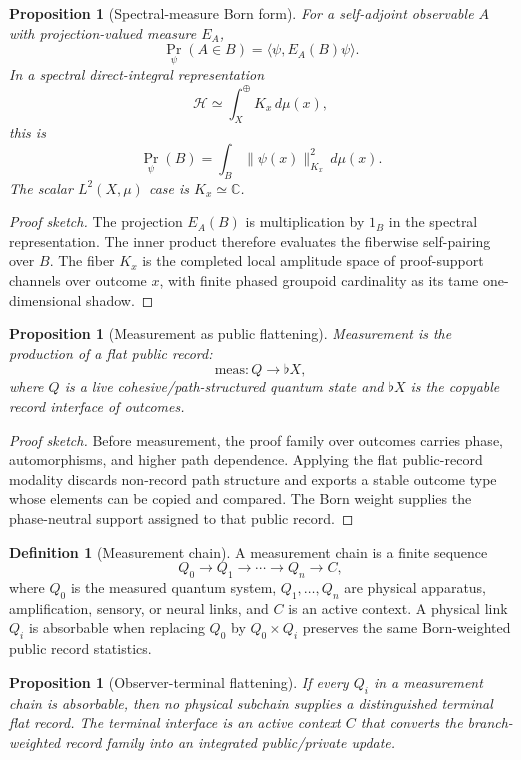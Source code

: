 \documentclass[11pt]{article}
\theoremstyle{plain}
\newtheorem{proposition}[theorem]{Proposition}
\theoremstyle{definition}
\newtheorem{definition}[theorem]{Definition}
\theoremstyle{remark}
\newenvironment{proofsketch}{\begin{proof}[Proof sketch]}{\end{proof}}
\newcommand{\Flat}{\flat}
\newcommand{\C}{\mathbb{C}}
\begin{document}
\begin{proposition}[Spectral-measure Born form]
For a self-adjoint observable \(A\) with projection-valued measure \(E_A\),
\[
\Pr_\psi(A\in B)=\langle\psi,E_A(B)\psi\rangle.
\]
In a spectral direct-integral representation
\[
\mathcal{H}\simeq\int_X^\oplus K_x\,d\mu(x),
\]
this is
\[
\Pr_\psi(B)=\int_B\|\psi(x)\|_{K_x}^2\,d\mu(x).
\]
The scalar \(L^2(X,\mu)\) case is \(K_x\simeq\C\).
\end{proposition}

\begin{proofsketch}
The projection \(E_A(B)\) is multiplication by \(1_B\) in the spectral representation. The inner product therefore evaluates the fiberwise self-pairing over \(B\). The fiber \(K_x\) is the completed local amplitude space of proof-support channels over outcome \(x\), with finite phased groupoid cardinality as its tame one-dimensional shadow.
\end{proofsketch}

\begin{proposition}[Measurement as public flattening]
Measurement is the production of a flat public record:
\[
\mathrm{meas}:Q\to\Flat X,
\]
where \(Q\) is a live cohesive/path-structured quantum state and \(\Flat X\) is the copyable record interface of outcomes.
\end{proposition}

\begin{proofsketch}
Before measurement, the proof family over outcomes carries phase, automorphisms, and higher path dependence. Applying the flat public-record modality discards non-record path structure and exports a stable outcome type whose elements can be copied and compared. The Born weight supplies the phase-neutral support assigned to that public record.
\end{proofsketch}

\begin{definition}[Measurement chain]
A measurement chain is a finite sequence
\[
Q_0\to Q_1\to\cdots\to Q_n\to C,
\]
where \(Q_0\) is the measured quantum system, \(Q_1,\ldots,Q_n\) are physical apparatus, amplification, sensory, or neural links, and \(C\) is an active context. A physical link \(Q_i\) is absorbable when replacing \(Q_0\) by \(Q_0\times Q_i\) preserves the same Born-weighted public record statistics.
\end{definition}

\begin{proposition}[Observer-terminal flattening]
If every \(Q_i\) in a measurement chain is absorbable, then no physical subchain supplies a distinguished terminal flat record. The terminal interface is an active context \(C\) that converts the branch-weighted record family into an integrated public/private update.
\end{proposition}
\end{document}
